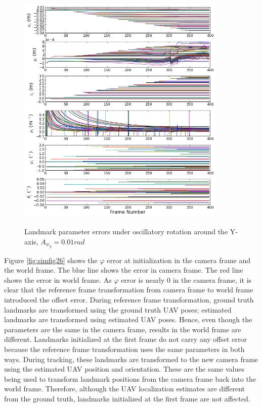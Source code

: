 \begin{figure}[h]
  \centering
  \includegraphics[width=10cm, height=12cm]{./Figures/SimulationFigures/Figure25.png}
  \caption{Landmark parameter errors under
    oscillatory rotation around the Y-axis, $A_{w_y}=0.01rad$}
  \label{fig:simfig25}
\end{figure}
\FloatBarrier

Figure \ref{fig:simfig26} shows the $\varphi$ error at initialization
in the camera frame and the world frame. The blue line shows the error in
camera frame. The red line shows the error in world frame. As
$\varphi$ error is nearly 0 in the camera frame, it is clear that the
reference frame transformation from camera frame to world frame
introduced the offset error. During reference frame transformation,
ground truth landmarks are transformed using the ground truth UAV
poses; estimated landmarks are transformed using estimated UAV poses.
Hence, even though the parameters are the same in the camera frame,
results in the world frame are different. Landmarks initialized at the
first frame do not carry any offset error because the reference frame
transformation uses the same parameters in both ways. During
tracking, these landmarks are transformed to the new camera frame
using the estimated UAV position and orientation. These are the same
values being used to transform landmark positions from the camera frame
back into the world frame. Therefore, although the UAV localization
estimates are different from the ground truth, landmarks initialized
at the first frame are not affected.

